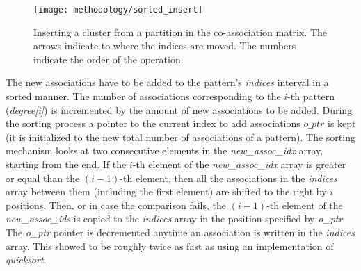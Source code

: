 \begin{figure}[hbtp]
\centering
\texttt{[image: methodology/sorted\_insert]}
\caption{Inserting a cluster from a partition in the co-association matrix. The arrows indicate to where the indices are moved. The numbers indicate the order of the operation.}
\label{fig:normal part}
\end{figure}


The new associations have to be added to the pattern's \emph{indices} interval in a sorted manner.
The number of associations corresponding to the $i$-th pattern (\emph{degree[i]}) is incremented by the amount of new associations to be added.
During the sorting process a pointer to the current index to add associations $o\_ptr$ is kept (it is initialized to the new total number of associations of a pattern).
The sorting mechanism looks at two consecutive elements in the \emph{new\_assoc\_idx} array, starting from the end.
If the $i$-th element of the \emph{new\_assoc\_idx} array is greater or equal than the $(i-1)$-th element, then all the associations in the \emph{indices} array between them (including the first element) are shifted to the right by $i$ positions. %
Then, or in case the comparison fails, the $(i-1)$-th element of the \emph{new\_assoc\_ids} is copied to the \emph{indices} array in the position specified by \emph{o\_ptr}.
The \emph{o\_ptr} pointer is decremented anytime an association is written in the \emph{indices} array.
This showed to be roughly twice as fast as using an implementation of \emph{quicksort}.


